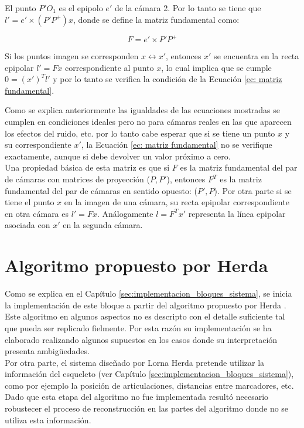 El punto $P'O_1$ es el epipolo $e'$ de la cámara 2. Por lo tanto se tiene que\\$l' = e' \times (P'P^+) x$, donde se define la matriz fundamental como:

\begin{equation}
F=e' \times P'P^+
\end{equation}

Si los puntos imagen se corresponden $x \leftrightarrow x'$, entonces $x'$ se encuentra en la recta epipolar $l'=Fx$ correspondiente al punto $x$, lo cual implica que se cumple $0=(x')^Tl'$ y por lo tanto se verifica la condición de la Ecuación \ref{ec: matriz fundamental}. 

Como se explica anteriormente las igualdades de las ecuaciones mostradas se cumplen en condiciones ideales pero no para cámaras reales en las que aparecen los efectos del ruido, etc. por lo tanto cabe esperar que si se tiene un punto $x$ y su correspondiente $x'$, la Ecuación \ref{ec: matriz fundamental} no se verifique exactamente, aunque si debe devolver un valor próximo a cero.\\

Una propiedad básica de esta matriz es que si $F$ es la matriz fundamental del par de cámaras con matrices de proyección ($P,P'$), entonces $F^T$ es la matriz fundamental del par de cámaras en sentido opuesto: ($P',P$). Por otra parte si se tiene el punto $x$ en la imagen de una cámara, su recta epipolar correspondiente en otra cámara es $l'=Fx$. Análogamente $l=F^Tx'$ representa la línea epipolar asociada con $x'$ en la segunda cámara.

\section{Algoritmo propuesto por Herda }

Como se explica en el Capítulo \ref{sec:implementacion_bloques_sistema}, se inicia la implementación de este bloque a partir del algoritmo propuesto por Herda \cite{herda}. Este algoritmo en algunos aspectos no es descripto con el detalle suficiente tal que pueda ser replicado fielmente. Por esta razón su implementación se ha elaborado realizando algunos supuestos en los casos donde su interpretación presenta ambigüedades.\\

Por otra parte, el sistema diseñado por Lorna Herda pretende utilizar la información del esqueleto (ver Capítulo \ref{sec:implementacion_bloques_sistema}), como por ejemplo la posición de articulaciones, distancias entre marcadores, etc. Dado que esta etapa del algoritmo no fue implementada resultó necesario robustecer el proceso de reconstrucción en las partes del algoritmo donde no se utiliza esta información.\\


